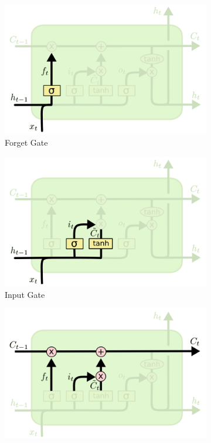 \begin{figure}[htb]
    \centering
    \begin{subfigure}{.45\linewidth}
        \centering
        \includegraphics[width=1.0\linewidth]{./assets/img/forget_gate.png}
        \caption{Forget Gate}
        \label{fig:lstm_forget_gate}
    \end{subfigure}
        \begin{subfigure}{.45\linewidth}
        \centering
        \includegraphics[width=1.0\linewidth]{./assets/img/input_gate.png}
        \caption{Input Gate}
        \label{fig:lstm_input_gate}
    \end{subfigure}
        \begin{subfigure}{.45\linewidth}
        \centering
        \includegraphics[width=1.0\linewidth]{./assets/img/update_gate.png}

\end{subfigure}
\end{figure}
